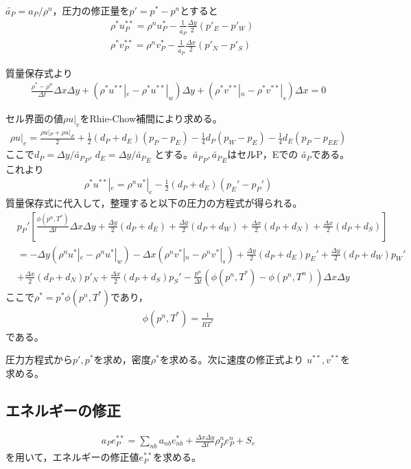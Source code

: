 \documentclass[a4paper,10pt,fleqn,dvipdfmx]{jsarticle}
\begin{document}
$\widetilde{a_P}=a_P/\rho^n$，圧力の修正量を$p'=p^*-p^n$とすると
\begin{align}
& \rho^*u_P^{**}=\rho^n u_P^* - \frac{1}{\widetilde{a_P}}\frac{\Delta
 y}{2}(p'_E-p'_W) \\
& \rho^*v_P^{**}=\rho^n v_P^* - \frac{1}{\widetilde{a_P}}\frac{\Delta
 x}{2}(p'_N-p'_S)
\end{align}

質量保存式より
\begin{align}
 \frac{\rho^* - \rho^n}{\Delta t} \Delta x \Delta y 
+ \left(\rho^* u^{**}|_e - \rho^* u^{**}|_w\right)\Delta y 
+ \left(\rho^* v^{**}|_n - \rho^* v^{**}|_s\right) \Delta x = 0   
\end{align}

セル界面の値$\rho u|_e$をRhie-Chow補間により求める。
\begin{align}
 \rho u|_e = \frac{\rho u|_P+\rho u|_E}{2} +
 \frac{1}{2}(d_P+d_E)(p_P-p_E) - \frac{1}{4}d_P(p_W-p_E) - \frac{1}{4}d_E(p_P-p_{EE})
\end{align}
ここで$d_P=\Delta y/\widetilde{a_P}_P$, $d_E=\Delta y/\widetilde{a_P}_E$
とする。$\widetilde{a_P}_P, \widetilde{a_P}_E$はセルP，Eでの
$\widetilde{a_P}$である。これより
\begin{align}
\rho^* u^{**}|_e=\rho^n u^*|_e - \frac{1}{2}(d_P+d_E)(p_E'-p_P') 
\end{align}
質量保存式に代入して，整理すると以下の圧力の方程式が得られる。
\begin{align}
& p_P'\left[\frac{\phi(p^n,T^*)}{\Delta t}\Delta x\Delta y + \frac{\Delta y}{2}(d_P+d_E)
 + \frac{\Delta y}{2}(d_P+d_W) + \frac{\Delta x}{2}(d_P+d_N) +
 \frac{\Delta x}{2}(d_P+d_S)\right] \nonumber \\
& = -\Delta y(\rho^n u^*|_e - \rho^n u^*|_w) - \Delta x(\rho^n
 v^*|_n-\rho^n v^*|_s) 
+\frac{\Delta y}{2}(d_P+d_E)p_E' + \frac{\Delta y}{2}(d_P+d_W)p_W'
 \nonumber \\ &+
 \frac{\Delta x}{2}(d_P+d_N)p'_N + \frac{\Delta x}{2}(d_P+d_S)p_S' -
 \frac{p^n}{\Delta t}(\phi(p^n,T^*) - \phi(p^n, T^n))\Delta x\Delta y
\end{align}
%
ここで$ \rho^* = p^*\phi(p^n, T^*)$であり，
\begin{align}
\phi(p^n,T^*) = \frac{1}{RT^*}
\end{align}
である。

圧力方程式から$p',p^*$を求め，密度$\rho^*$を求める。次に速度の修正式より
$u^{**}, v^{**}$を求める。

\subsection{エネルギーの修正}
\begin{align}
 a_Pe_P^{**} 
= \sum_{nb} a_{nb} e_{nb}^* + \frac{\Delta x \Delta y}{\Delta t}\rho^n_P e_P^n
 +S_e
\end{align}
を用いて，エネルギーの修正値$e^{**}_P$を求める。
\end{document}
